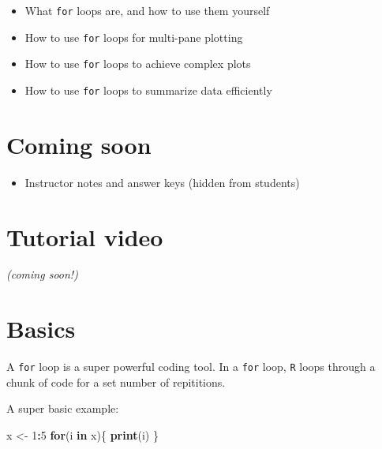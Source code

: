 \documentclass[
]{book}
\newenvironment{Shaded}{\begin{snugshade}}{\end{snugshade}}
\newcommand{\ControlFlowTok}[1]{\textcolor[rgb]{0.13,0.29,0.53}{\textbf{#1}}}
\newcommand{\DecValTok}[1]{\textcolor[rgb]{0.00,0.00,0.81}{#1}}
\newcommand{\KeywordTok}[1]{\textcolor[rgb]{0.13,0.29,0.53}{\textbf{#1}}}
\newcommand{\NormalTok}[1]{#1}
\newcommand{\OperatorTok}[1]{\textcolor[rgb]{0.81,0.36,0.00}{\textbf{#1}}}
\newcommand{\StringTok}[1]{\textcolor[rgb]{0.31,0.60,0.02}{#1}}
\providecommand{\tightlist}{%
  \setlength{\itemsep}{0pt}\setlength{\parskip}{0pt}}
\begin{document}
\begin{itemize}
\tightlist
\item
  What \texttt{for} loops are, and how to use them yourself
\item
  How to use \texttt{for} loops for multi-pane plotting\\
\item
  How to use \texttt{for} loops to achieve complex plots\\
\item
  How to use \texttt{for} loops to summarize data efficiently
\end{itemize}

\hypertarget{coming-soon}{%
\section*{Coming soon}\label{coming-soon}}

\begin{itemize}
\tightlist
\item
  Instructor notes and answer keys (hidden from students)
\end{itemize}

\hypertarget{tutorial-video-4}{%
\section*{Tutorial video}\label{tutorial-video-4}}

\emph{(coming soon!)}

\hypertarget{basics}{%
\section*{Basics}\label{basics}}

A \texttt{for} loop is a super powerful coding tool. In a \texttt{for} loop, \texttt{R} loops through a chunk of code for a set number of repititions.

A super basic example:

\begin{Shaded}
\begin{Highlighting}[]
\NormalTok{x <-}\StringTok{ }\DecValTok{1}\OperatorTok{:}\DecValTok{5}
\ControlFlowTok{for}\NormalTok{(i }\ControlFlowTok{in}\NormalTok{ x)\{}
  \KeywordTok{print}\NormalTok{(i)}
\NormalTok{\}}
\end{Highlighting}
\end{Shaded}
\end{document}
